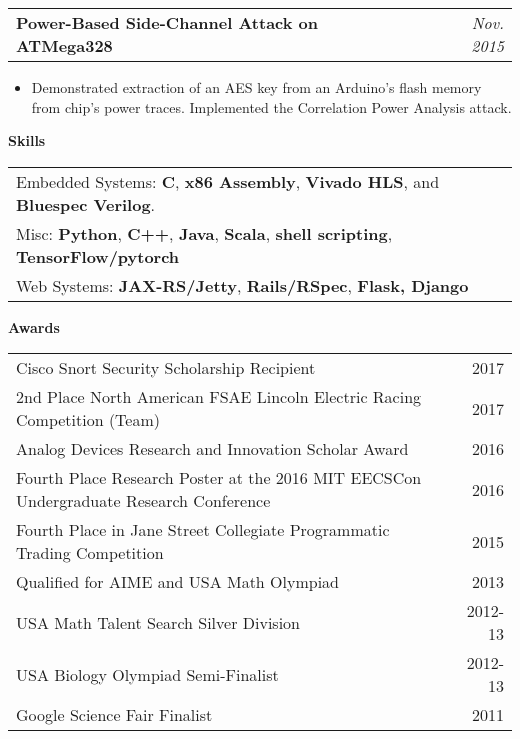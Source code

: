 \documentclass[letterpaper,11pt]{article}
\makeatletter
\newcommand{\resitem}[1]{\item[--] #1 \vspace{-4pt}}
\newcommand{\ressubheadingtwo}[2] {
\begin{tabular*}{7in}{l@{\extracolsep{\fill}}r}
	\textbf{#1} & \textit{#2} \\
\end{tabular*}\vspace{-6pt}}
\makeatother
\begin{document}
    \ressubheadingtwo{Power-Based Side-Channel Attack on ATMega328}{Nov. 2015}{}
	\begin{itemize}
            \resitem{Demonstrated extraction of an AES key from an Arduino's flash memory from chip's power traces. Implemented the Correlation Power Analysis attack.}
	\end{itemize}

    \vspace{0.05in}

\large \textbf{Skills\vspace{1mm}} \normalsize
	 \begin{tabular*}{7in}{l@{\extracolsep{\fill}}r}
         \hspace{2mm} Embedded Systems: \textbf{C}, \textbf{x86 Assembly}, \textbf{Vivado HLS}, and \textbf{Bluespec Verilog}. \\
         \hspace{2mm} Misc: \textbf{Python}, \textbf{C++}, \textbf{Java}, \textbf{Scala}, \textbf{shell scripting}, \textbf{TensorFlow/pytorch}  \\
         \hspace{2mm} Web Systems: \textbf{JAX-RS/Jetty}, \textbf{Rails/RSpec}, \textbf{Flask, Django} \\
	\end{tabular*}

\vspace{0.1in}
\large \textbf{Awards\vspace{2mm}} \normalsize
	 \begin{tabular*}{7in}{l@{\extracolsep{\fill}}r}
		 \hspace{2mm} Cisco Snort Security Scholarship Recipient & 2017\\
		 \hspace{2mm} 2nd Place North American FSAE Lincoln Electric Racing Competition (Team) & 2017\\
		 \hspace{2mm} Analog Devices Research and Innovation Scholar Award & 2016\\
		 \hspace{2mm} Fourth Place Research Poster at the 2016 MIT EECSCon Undergraduate Research Conference & 2016\\
		 \hspace{2mm} Fourth Place in Jane Street Collegiate Programmatic Trading Competition & 2015\\
		 \hspace{2mm} Qualified for AIME and USA Math Olympiad & 2013\\
		 \hspace{2mm} USA Math Talent Search Silver Division & 2012-13\\
		 \hspace{2mm} USA Biology Olympiad Semi-Finalist & 2012-13\\
		 \hspace{2mm} Google Science Fair Finalist & 2011\\
	\end{tabular*}
\end{document}
